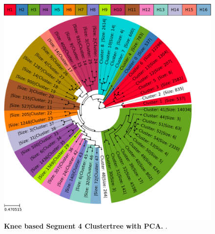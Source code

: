\begin{figure}[!hbt]

            \includegraphics[width=\dimexpr\textwidth-2\fboxsep-2\fboxrule,fbox]{PCA/Clustertree_Segment_4_H_Knee.pdf}
    
    \caption[Knee based Segment 4 Clustertree with \Acrshort{PCA}]{\textbf{Knee based Segment 4 Clustertree with \Acrshort{PCA}.} .}
    \label{fig:PCA_Clusteree_Knee_4}
\end{figure}

